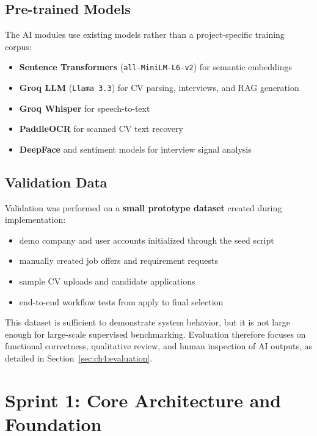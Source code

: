 \subsection{Pre-trained Models}

The AI modules use existing models rather than a project-specific training corpus:
\begin{itemize}
    \item \textbf{Sentence Transformers} (\texttt{all-MiniLM-L6-v2}) for semantic embeddings
    \item \textbf{Groq LLM} (\texttt{Llama~3.3}) for CV parsing, interviews, and RAG generation
    \item \textbf{Groq Whisper} for speech-to-text
    \item \textbf{PaddleOCR} for scanned CV text recovery
    \item \textbf{DeepFace} and sentiment models for interview signal analysis
\end{itemize}

\subsection{Validation Data}

Validation was performed on a \textbf{small prototype dataset} created during implementation:
\begin{itemize}
    \item demo company and user accounts initialized through the seed script
    \item manually created job offers and requirement requests
    \item sample CV uploads and candidate applications
    \item end-to-end workflow tests from apply to final selection
\end{itemize}

This dataset is sufficient to demonstrate system behavior, but it is not large enough for large-scale supervised benchmarking. Evaluation therefore focuses on functional correctness, qualitative review, and human inspection of AI outputs, as detailed in Section~\ref{sec:ch4:evaluation}.
\section{Sprint 1: Core Architecture and Foundation} \label{chap4:sec1}

